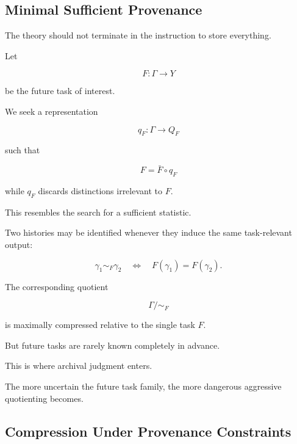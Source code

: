 \documentclass[
  11pt,
  a4paper,
  DIV=12,
  BCOR=0mm,
  parskip=half-
]{scrartcl}
\theoremstyle{definition}
\theoremstyle{plain}
\theoremstyle{remark}
\begin{document}

\subsection{Minimal Sufficient Provenance}
\label{app:minimal-sufficient-provenance}

The theory should not terminate in the instruction to store everything.

Let

\[
  F:\Gamma\to Y
\]

be the future task of interest.

We seek a representation

\[
  q_F:\Gamma\to Q_F
\]

such that

\[
  F=\bar F\circ q_F
\]

while \(q_F\) discards distinctions irrelevant to \(F\).

This resembles the search for a sufficient statistic.

Two histories may be identified whenever they induce the same task-relevant
output:

\[
  \gamma_1\sim_F\gamma_2
  \quad\Longleftrightarrow\quad
  F(\gamma_1)=F(\gamma_2).
\]

The corresponding quotient

\[
  \Gamma/{\sim_F}
\]

is maximally compressed relative to the single task \(F\).

But future tasks are rarely known completely in advance.

This is where archival judgment enters.

The more uncertain the future task family, the more dangerous aggressive
quotienting becomes.


\subsection{Compression Under Provenance Constraints}
\label{app:originist-rate-distortion}
\end{document}
